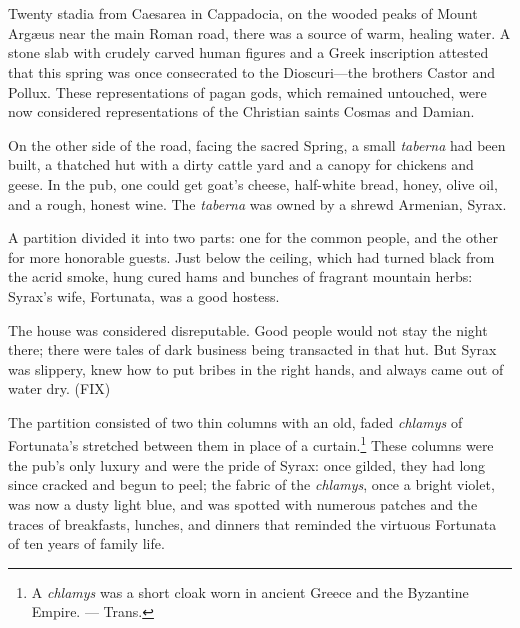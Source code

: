 \part{}

\chapter{} %

Twenty stadia from Caesarea in Cappadocia, on the wooded peaks of Mount
Arg\ae us near the main Roman road, there was a source of warm,
healing water. A stone slab with crudely carved human figures and a
Greek inscription attested that this spring was once consecrated to
the Dioscuri---the brothers Castor and Pollux. These representations
of pagan gods, which remained untouched, were now considered
representations of the Christian saints Cosmas and Damian.

On the other side of the road, facing the sacred Spring, a small
\textit{taberna} had been built, a thatched hut with a dirty cattle
yard and a canopy for chickens and geese. In the pub, one could get
goat's cheese, half-white bread, honey, olive oil, and a rough, honest
wine. The \textit{taberna} was owned by a shrewd Armenian, Syrax.

A partition divided it into two parts: one for the common people, and the
other for more honorable guests. Just below the ceiling, which had
turned black from the acrid smoke, hung cured hams and bunches of
fragrant mountain herbs: Syrax's wife, Fortunata, was a good hostess.

The house was considered disreputable. Good people would not stay
the night there; there were tales of dark business being transacted in
that hut. But Syrax was slippery, knew how to put bribes in the right
hands, and always came out of water dry. (FIX)

The partition consisted of two thin columns with an old, faded
\textit{chlamys} of Fortunata's stretched between them in place of a
curtain.\footnote{A \textit{chlamys} was a short cloak worn in ancient Greece
  and the Byzantine Empire. --- Trans.} These columns were the pub's
only luxury and were the pride of Syrax: once gilded, they had long
since cracked and begun to peel; the fabric of the \textit{chlamys},
once a bright violet, was now a dusty light blue, and was spotted with
numerous patches and the traces of breakfasts, lunches, and dinners
that reminded the virtuous Fortunata of ten years of family life.

